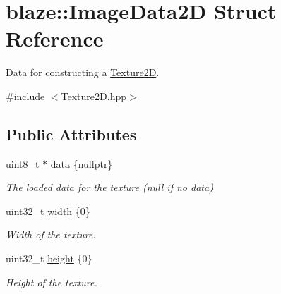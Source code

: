 \hypertarget{structblaze_1_1ImageData2D}{}\section{blaze\+:\+:Image\+Data2D Struct Reference}
\label{structblaze_1_1ImageData2D}


Data for constructing a \hyperlink{classblaze_1_1Texture2D}{Texture2D}.  




{\ttfamily \#include $<$Texture2\+D.\+hpp$>$}

\subsection*{Public Attributes}
\begin{DoxyCompactItemize}
\item 
\mbox{\label{structblaze_1_1ImageData2D_a8c6dc8801a2592f1de91c6808ce3b372}} 
uint8\+\_\+t $\ast$ \hyperlink{structblaze_1_1ImageData2D_a8c6dc8801a2592f1de91c6808ce3b372}{data} \{nullptr\}
\begin{DoxyCompactList}\small\item\em The loaded data for the texture (null if no data) \end{DoxyCompactList}\item 
\mbox{\label{structblaze_1_1ImageData2D_a7734b8966676e08a2a6458fcf4aa70d1}} 
uint32\+\_\+t \hyperlink{structblaze_1_1ImageData2D_a7734b8966676e08a2a6458fcf4aa70d1}{width} \{0\}
\begin{DoxyCompactList}\small\item\em Width of the texture. \end{DoxyCompactList}\item 
\mbox{\label{structblaze_1_1ImageData2D_a1d1329918abdcc99fea0ae1b6d5a18ca}} 
uint32\+\_\+t \hyperlink{structblaze_1_1ImageData2D_a1d1329918abdcc99fea0ae1b6d5a18ca}{height} \{0\}
\begin{DoxyCompactList}\small\item\em Height of the texture. \end{DoxyCompactList}\item 
\mbox{\label{structblaze_1_1ImageData2D_ac2f2933e59ead303532fffd599754bf0}} 

\end{DoxyCompactItemize}
